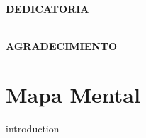 \documentclass[12pt,a4paper,oneside]{book}
\begin{document}
\newpage
\newpage
$\ $
\thispagestyle{empty} %





\begin{titlepage}

\begin{flushright}
{\large \bf DEDICATORIA}
\\
\textit{}
\\
\textit{} %
\end{flushright}
\end{titlepage}


\begin{titlepage}

\begin{flushright}
{\large \bf AGRADECIMIENTO}
\\
\textit{}
{} %
\end{flushright}
\end{titlepage}



\tableofcontents
\cleardoublepage
\listoftables
\listoffigures 
\newpage






\chapter{Mapa Mental}
{introduction}
\end{document}
